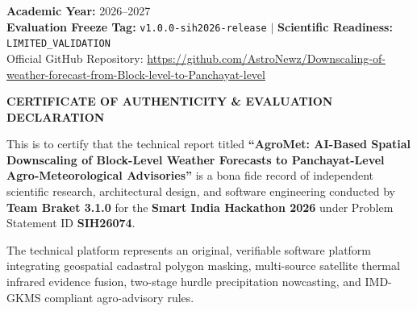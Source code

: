 \documentclass[11pt,a4paper,oneside]{report}
\begin{document}
\begin{titlepage}
\begin{center}
\vfill
{\large \textbf{Academic Year:} 2026--2027}\\[0.1cm]
{\small \textbf{Evaluation Freeze Tag:} \texttt{v1.0.0-sih2026-release} $|$ \textbf{Scientific Readiness:} \texttt{LIMITED\_VALIDATION}}\\[0.15cm]
{\small Official GitHub Repository: \url{https://github.com/AstroNewz/Downscaling-of-weather-forecast-from-Block-level-to-Panchayat-level}}

\end{center}
\end{titlepage}

\newpage
\thispagestyle{plain}
\begin{center}
{\Large \textbf{\color{navyblue}CERTIFICATE OF AUTHENTICITY \& EVALUATION DECLARATION}}\\[0.5cm]
\end{center}

\noindent This is to certify that the technical report titled \textbf{``AgroMet: AI-Based Spatial Downscaling of Block-Level Weather Forecasts to Panchayat-Level Agro-Meteorological Advisories''} is a bona fide record of independent scientific research, architectural design, and software engineering conducted by \textbf{Team Braket 3.1.0} for the \textbf{Smart India Hackathon 2026} under Problem Statement ID \textbf{SIH26074}.

\vspace{0.4cm}
\noindent The technical platform represents an original, verifiable software platform integrating geospatial cadastral polygon masking, multi-source satellite thermal infrared evidence fusion, two-stage hurdle precipitation nowcasting, and IMD-GKMS compliant agro-advisory rules.
\end{document}
